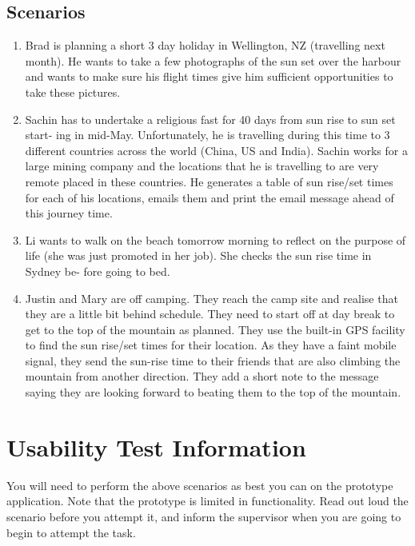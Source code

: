 \documentclass[a4paper, parskip=half]{scrartcl}
\begin{document}
\subsection{Scenarios}
\begin{enumerate}
  \item{
    Brad is planning a short 3 day holiday in Wellington, NZ (travelling
    next month). He wants to take a few photographs of the sun set over the
    harbour and wants to make sure his flight times give him sufficient
    opportunities to take these pictures.
  }

  \item{
    Sachin has to undertake a religious fast for 40 days from sun rise to
    sun set start- ing in mid-May. Unfortunately, he is travelling during this
    time to 3 different countries across the world (China, US and India). Sachin
    works for a large mining company and the locations that he is travelling to
    are very remote placed in these countries. He generates a table of sun
    rise/set times for each of his locations, emails them and print the email
    message ahead of this journey time.
  }

  \item{
    Li wants to walk on the beach tomorrow morning to reflect on the purpose
    of life (she was just promoted in her job). She checks the sun rise time in
    Sydney be- fore going to bed.
  }

  \item{
    Justin and Mary are off camping. They reach the camp site and realise
    that they are a little bit behind schedule. They need to start off at day
    break to get to the top of the mountain as planned. They use the built-in
    GPS facility to find the sun rise/set times for their location. As they have
    a faint mobile signal, they send the sun-rise time to their friends that are
    also climbing the mountain from another direction. They add a short note to
    the message saying they are looking forward to beating them to the top of the
    mountain.
  }
\end{enumerate}

\section{Usability Test Information}
You will need to perform the above scenarios as best you can on the prototype
application. Note that the prototype is limited in functionality. Read out loud
the scenario before you attempt it, and inform the supervisor when you are going to
begin to attempt the task.
\end{document}
